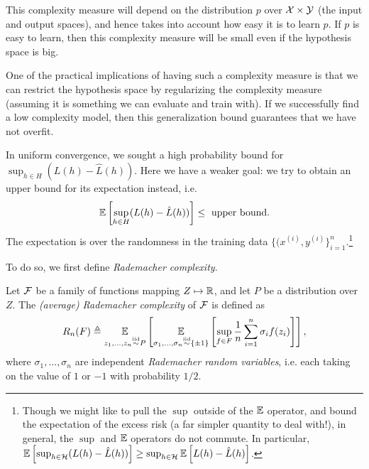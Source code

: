 This complexity measure will depend on the distribution $p$ over $\mathcal X \times \mathcal Y$ (the input and output spaces), and hence takes into account how easy it is to learn $p$. If $p$ is easy to learn, then this complexity measure will be small even if the hypothesis space is big. 

One of the practical implications of having such a complexity measure is that we can restrict the hypothesis space by regularizing the complexity measure (assuming it is something we can evaluate and train with). If we successfully find a low complexity model, then this generalization bound guarantees that we have not overfit.


In uniform convergence, we sought a high probability bound for $\sup_{h \in H}(L(h) - \hat L (h))$. Here we have a weaker goal: we try to obtain an upper bound for its expectation instead, i.e.
\begin{equation}
\operatorname*{\mathbb{E}}\left[ \sup_{h \in H}(L(h) - \hat L (h)) \right] \leq \text{ upper bound}.
\end{equation}
The expectation is over the randomness in the training data $\{(x^{(i)}, y^{(i)}\}_{i=1}^n$.\footnote{Though we might like to pull the $\sup$ outside of the $\operatorname*{\mathbb{E}}$ operator, and bound the expectation of the excess risk (a far simpler quantity to deal with!), in general, the $\sup$ and $\operatorname*{\mathbb{E}}$ operators do not commute. In particular, $\operatorname*{\mathbb{E}}\left [\sup_{h \in \mathcal H} (L(h) - \hat{L}(h)) \right ] \geq \sup_{h \in \mathcal H} \operatorname*{\mathbb{E}} \left[ L(h) - \hat{L} (h) \right]$.}


To do so, we first define \textit{Rademacher complexity}.

\begin{definition} \label{lec5:dfn:rc}
Let $\mathcal F$ be a family of functions mapping $Z \mapsto \mathbb R$, and let $P$ be a distribution over $Z$. The \textit{(average) Rademacher complexity} of $\mathcal F$ is defined as 
\begin{align}
    R_n(F) \triangleq \operatorname*{\mathbb{E}}_{z_1, \dots, z_n \overset{\textup{iid}}{\sim} P} \left[ 
    \operatorname*{\mathbb{E}}_{\sigma_1, \dots, \sigma_n \overset{\textup{iid}}{\sim}\{ \pm 1 \}} \left[ \sup_{f\in F} \frac{1}{n} \sum^n_{i=1} \sigma_i f(z_i) \right] \right], \label{lec5:eqn:Rn}
\end{align}
where $\sigma_1, \dots, \sigma_n$ are independent \textit{Rademacher random variables}, i.e. each taking on the value of $1$ or $-1$ with probability $1/2$.
\end{definition}

